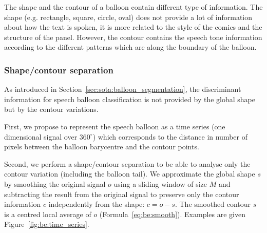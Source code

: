 The shape and the contour of a balloon contain different type of information.
The shape (e.g. rectangle, square, circle, oval) does not provide a lot of information about how the text is spoken, it is more related to the style of the comics and the structure of the panel.
However, the contour contains the speech tone information according to the different patterns which are along the boundary of the balloon.




\subsubsection{Shape/contour separation}
\label{sec:contour_detection}
As introduced in Section~\ref{sec:sota:balloon_segmentation}, the discriminant information for speech balloon classification is not provided by the global shape but by the contour variations. 

First, we propose to represent the speech balloon as a time series (one dimensional signal over $360^\circ$) which corresponds to the distance in number of pixels between the balloon barycentre and the contour points. 

Second, we perform a shape/contour separation to be able to analyse only the contour variation (including the balloon tail). We approximate the global shape $s$ by smoothing the original signal $o$ using a sliding window of size $M$ and subtracting the result from the original signal to preserve only the contour information $c$ independently from the shape: $c = o - s$. The smoothed contour $s$ is a centred local average of $o$ (Formula~\ref{eq:be:smooth}).
Examples are given Figure~\ref{fig:be:time_series}.



